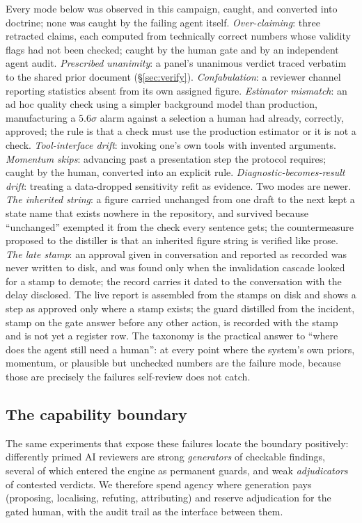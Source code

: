 Every mode below was observed in this campaign, caught, and converted into
doctrine; none was caught by the failing agent itself.
\emph{Over-claiming}: three retracted claims, each computed from technically
correct numbers whose validity flags had not been checked; caught by the
human gate and by an independent agent audit. \emph{Prescribed unanimity}:
a panel's unanimous verdict traced verbatim to the shared prior document
(\S\ref{sec:verify}). \emph{Confabulation}: a reviewer channel reporting
statistics absent from its own assigned figure. \emph{Estimator mismatch}:
an ad hoc quality check using a simpler background model than production,
manufacturing a $5.6\sigma$ alarm against a selection a human had already,
correctly, approved; the rule is that a check must use the production
estimator or it is not a check. \emph{Tool-interface drift}: invoking one's
own tools with invented arguments. \emph{Momentum skips}: advancing past a
presentation step the protocol requires; caught by the human, converted
into an explicit rule. \emph{Diagnostic-becomes-result drift}: treating a
data-dropped sensitivity refit as evidence. Two modes are newer. \emph{The
inherited string}: a figure carried unchanged from one draft to the next
kept a state name that exists nowhere in the repository, and survived
because ``unchanged'' exempted it from the check every sentence gets; the
countermeasure proposed to the distiller is that an inherited figure
string is verified like prose.
\emph{The late stamp}: an approval given in conversation and reported as
recorded was never written to disk, and was found only when the
invalidation cascade looked for a stamp to demote; the record carries it
dated to the conversation with the delay disclosed. The live report is
assembled from the stamps on disk and shows a step as approved only where
a stamp exists; the guard distilled from the incident, stamp on the gate
answer before any other action, is recorded with the stamp and is not yet
a register row. The taxonomy
is the practical answer to ``where does the agent still need a human'': at
every point where the system's own priors, momentum, or plausible but
unchecked numbers are the failure mode, because those are precisely the
failures self-review does not catch.

\subsection{The capability boundary}

The same experiments that expose these failures locate the boundary
positively: differently primed AI reviewers are strong \emph{generators} of
checkable findings, several of which entered the engine as permanent
guards, and weak \emph{adjudicators} of contested verdicts. We therefore
spend agency where generation pays (proposing, localising, refuting,
attributing) and reserve adjudication for the gated human, with the audit
trail as the interface between them.

